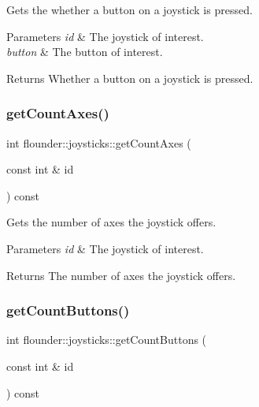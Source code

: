 Gets the whether a button on a joystick is pressed. 


\begin{DoxyParams}{Parameters}
{\em id} & The joystick of interest. \\
\hline
{\em button} & The button of interest. \\
\hline
\end{DoxyParams}
\begin{DoxyReturn}{Returns}
Whether a button on a joystick is pressed. 
\end{DoxyReturn}
\mbox{\label{classflounder_1_1joysticks_a6c40b337283dcedf290c7f60d2eebd21}} 
\subsubsection{\texorpdfstring{get\+Count\+Axes()}{getCountAxes()}}
{\footnotesize\ttfamily int flounder\+::joysticks\+::get\+Count\+Axes (\begin{DoxyParamCaption}\item[{const int \&}]{id }\end{DoxyParamCaption}) const\hspace{0.3cm}{\ttfamily [inline]}}



Gets the number of axes the joystick offers. 


\begin{DoxyParams}{Parameters}
{\em id} & The joystick of interest. \\
\hline
\end{DoxyParams}
\begin{DoxyReturn}{Returns}
The number of axes the joystick offers. 
\end{DoxyReturn}
\mbox{\label{classflounder_1_1joysticks_a3023745d58680e4efb7650198eebc4ed}} 
\subsubsection{\texorpdfstring{get\+Count\+Buttons()}{getCountButtons()}}
{\footnotesize\ttfamily int flounder\+::joysticks\+::get\+Count\+Buttons (\begin{DoxyParamCaption}\item[{const int \&}]{id }\end{DoxyParamCaption}) const\hspace{0.3cm}{\ttfamily [inline]}}



